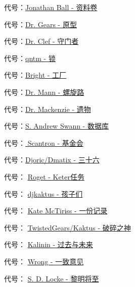 \begin{scpboxbrc}

代号：\hyperref[chap:SCP-001.sheaf.of.papers]{Jonathan Ball - 资料卷}

代号：\hyperref[chap:SCP-001.the.prototype]{Dr. Gears - 原型}

代号：\hyperref[chap:SCP-001.the.gate.guardian]{Dr. Clef - 守门者}

代号：\hyperref[chap:SCP-001.the.lock]{qntm - 锁}

代号：\hyperref[chap:SCP-001.the.factory]{Bright - 工厂}

代号：\hyperref[chap:SCP-001.the.spiral.path]{Dr. Mann - 螺旋路}

代号：\hyperref[chap:SCP-001.the.legacy]{Dr. Mackenzie - 遗物}

代号：\hyperref[chap:SCP-001.the.database]{S. Andrew Swann - 数据库}

代号：\hyperref[chap:SCP-001.the.foundation]{ Scantron - 基金会}

代号：\hyperref[chap:SCP-001.thirty.six]{Djoric/Dmatix - 三十六}

代号： \hyperref[chap:SCP-001.keter.duty]{Roget - Keter任务}

代号： \hyperref[chap:SCP-001.the.children]{djkaktus - 孩子们}

代号： \hyperref[chap:SCP-001.a.record]{Kate McTiriss - 一份记录}

代号： \hyperref[chap:SCP-001.the.broken.god]{TwistedGears/Kaktus - 破碎之神}

代号： \hyperref[chap:SCP-001.past.and.future]{Kalinin - 过去与未来}

代号： \hyperref[chap:SCP-001.the.consensus]{Wrong - 一致意见}

代号： \hyperref[chap:SCP-001.when.day.breaks]{S. D. Locke - 黎明将至}

\end{scpboxbrc}

